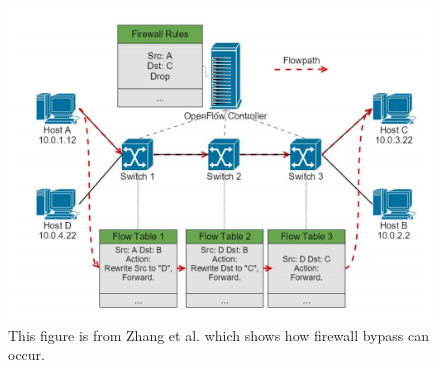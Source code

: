 \begin{figure}[t]
  \includegraphics[width=\linewidth]{firewall_bypass.png}
  \caption{This figure is from Zhang et al. \cite{} which shows how firewall bypass can occur.}
  \label{fig:firewall_bypass}
\end{figure}
